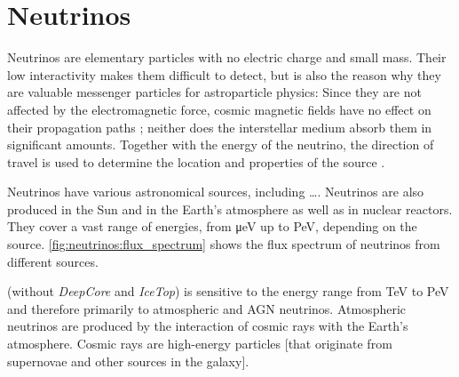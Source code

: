 \section{Neutrinos}

Neutrinos are elementary particles with no electric charge and small mass. %
Their low interactivity
  makes them difficult to detect,
  but is also the reason why they are valuable messenger particles for astroparticle physics:
Since they are not affected by the electromagnetic force,
  cosmic magnetic fields have no effect on their propagation paths \cite{neutrinos_katz};
  neither does the interstellar medium absorb them in significant amounts.
Together with the energy of the neutrino,
  the direction of travel %
  is used to determine the location and properties of the source \cite{neutrinos_katz}.


Neutrinos have various astronomical sources,
including
  …. %
Neutrinos are also produced in
  the Sun
  and in the Earth's atmosphere
  as well as in nuclear reactors.
They cover a vast range of energies, from \si{\micro\electronvolt} up to \si{\peta\electronvolt},
  depending on the source. \citationneeded{}
\autoref{fig:neutrinos:flux_spectrum} shows the flux spectrum of neutrinos from different sources.

\icecube{}
  (without \emph{DeepCore} and \emph{IceTop})
is sensitive to
  the energy range from \si{\tera\electronvolt} to \si{\peta\electronvolt} \cite{icecube_aartsen}
  and therefore primarily to atmospheric and AGN neutrinos.
%
Atmospheric neutrinos are produced by the interaction of cosmic rays with the Earth's atmosphere.
Cosmic rays are high-energy particles
  [that originate from supernovae and other sources in the galaxy].



